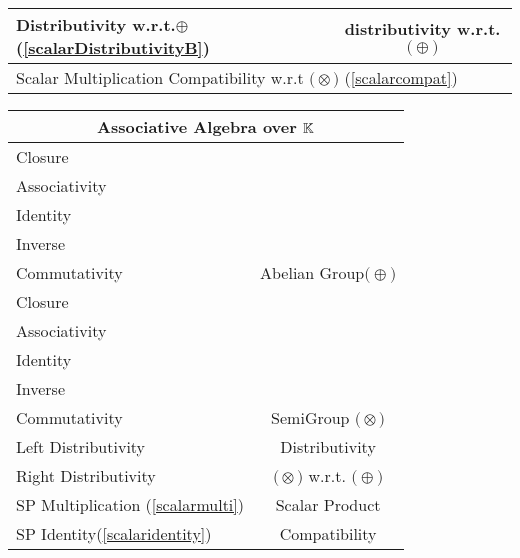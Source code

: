 \documentclass[a4paper,12pt]{scrartcl}    %
\newcommand{\OpA}{\otimes}
\newcommand{\OpB}{\oplus}
\begin{document}
\begin{landscape}
\begin{minipage}[t][]{0.60 \linewidth}
\begin{minipage}[c]{0,5\textwidth}
\begin{tabular}{|l|c|}
			    \cellcolor{blue!25} \footnotesize Distributivity w.r.t.$\OpB$ (\ref{scalarDistributivityB}) & \tiny\cellcolor{yellow!25} distributivity w.r.t. $\big(\OpB\big)$  \\
			   \hline
			    \multicolumn{2}{l}{\footnotesize \cellcolor{red!25} Scalar Multiplication Compatibility w.r.t  $\big(\OpA\big)$ (\ref{scalarcompat})}\\
			   \hline
			\end{tabular}
			\vfill
			\begin{tabular}{|l|c|} %
			  \hline
			  \multicolumn{2}{c}{\cellcolor{green!25}Associative Algebra over $\mathbb{K}$} \\
			  \hline
			    \cellcolor{blue!25} \footnotesize Closure& \cellcolor{yellow!25}  \\
			    \cellcolor{blue!25} \footnotesize Associativity& \cellcolor{yellow!25}  \\
			    \cellcolor{blue!25} \footnotesize Identity& \cellcolor{yellow!25} \\
			    \cellcolor{blue!25} \footnotesize Inverse& \cellcolor{yellow!25} \\
			    \cellcolor{blue!25} \footnotesize Commutativity& \multirow{-5}{*}{\tiny\cellcolor{yellow!25}Abelian Group$\big(\OpB\big)$} \\
			   \hline
			    \cellcolor{blue!25} \footnotesize Closure& \cellcolor{yellow!25}  \\
			    \cellcolor{blue!25} \footnotesize Associativity& \cellcolor{yellow!25}  \\
			    \cellcolor{red!25} \footnotesize Identity& \cellcolor{yellow!25} \\
			    \cellcolor{red!25} \footnotesize Inverse& \cellcolor{yellow!25} \\
			    \cellcolor{red!25} \footnotesize Commutativity& \multirow{-5}{*}{\tiny\cellcolor{yellow!25} SemiGroup $\big(\OpA\big)$} \\
			  \hline
			  	\cellcolor{blue!25} \footnotesize Left Distributivity&  \tiny\cellcolor{yellow!25}Distributivity\\
			    \cellcolor{blue!25} \footnotesize Right Distributivity & \tiny\cellcolor{yellow!25} $\big(\OpA\big)$ w.r.t. $\big(\OpB\big)$  \\
			   \hline
			  \hline
			     \cellcolor{blue!25} \footnotesize SP Multiplication (\ref{scalarmulti})&  \tiny\cellcolor{yellow!25}Scalar Product\\
			    \cellcolor{blue!25} \footnotesize SP Identity(\ref{scalaridentity}) & \tiny\cellcolor{yellow!25} Compatibility  \\

\end{tabular}
\end{minipage}
\end{minipage}
\end{landscape}
\end{document}
